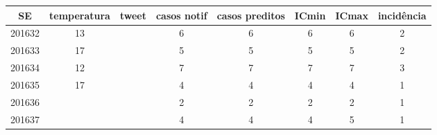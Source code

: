\begin{tabular}{c|ccccccc}
  \hline
SE & temperatura & tweet & casos notif & casos preditos & ICmin & ICmax & incidência \\ 
  \hline
201632 & 13 &  & 6 & 6 & 6 & 6 & 2 \\ 
  201633 & 17 &  & 5 & 5 & 5 & 5 & 2 \\ 
  201634 & 12 &  & 7 & 7 & 7 & 7 & 3 \\ 
  201635 & 17 &  & 4 & 4 & 4 & 4 & 1 \\ 
  201636 &  &  & 2 & 2 & 2 & 2 & 1 \\ 
  201637 &  &  & 4 & 4 & 4 & 5 & 1 \\ 
   \hline
\end{tabular}
